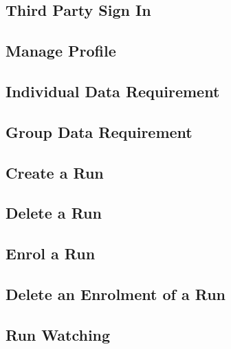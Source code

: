 \subsection{Third Party Sign In}

\clearpage

\subsection{Manage Profile}

\clearpage

\subsection{Individual Data Requirement}

\clearpage

\subsection{Group Data Requirement}

\clearpage

\subsection{Create a Run}

\clearpage

\subsection{Delete a Run}

\clearpage

\subsection{Enrol a Run}

\clearpage

\subsection{Delete an Enrolment of a Run}

\clearpage

\subsection{Run Watching}

\clearpage
